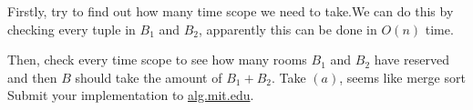 \documentclass[12pt,twoside]{article}
\begin{document}
\begin{problems}
\begin{problemparts}
\problempart %
Firstly, try to find out how many time scope we need to take.We can do this by checking
every tuple in $B_1$ and $B_2$, apparently this can be done in $O(n)$ time.

Then, check every time scope to see how many rooms $B_1$ and $B_2$ have reserved
and then $B$ should take the amount of $B_1+B_2$.
\problempart %
Take $(a)$, seems like merge sort
\problempart Submit your implementation to {\small\url{alg.mit.edu}}.
\end{problemparts}

\end{problems}
\end{document}
